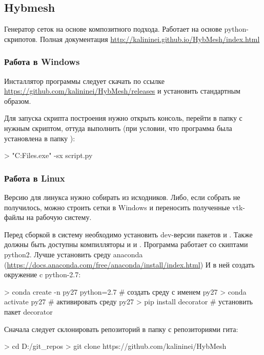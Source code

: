 \subsection{Hybmesh}
\label{sec:hybmesh}

Генератор сеток на основе композитного подхода.
Работает на основе python-скрипотов.
Полная документация \url{http://kalininei.github.io/HybMesh/index.html}

\subsubsection{Работа в Windows}
Инсталлятор программы следует скачать по ссылке
\url{https://github.com/kalininei/HybMesh/releases}
и установить стандартным образом.

Для запуска скрипта построения  нужно
открыть консоль, перейти в папку с нужным скриптом,
оттуда выполнить (при условии, что программа была установлена в папку ):
\begin{shelloutput}
> "C:\Program Files\HybMesh\bin\hybmesh.exe" -sx script.py
\end{shelloutput}

\subsubsection{Работа в Linux}
Версию для линукса нужно собирать из исходников.
Либо, если собрать не получилось,
можно строить сетки в Windows и переносить
полученные vtk-файлы на рабочую систему. 

Перед сборкой в систему необходимо установить dev-версии
пакетов  и . Также 
должны быть доступны компилляторы  и  и .
Программа работает со скиптами python2.
Лучше установить среду anaconda (\url{https://docs.anaconda.com/free/anaconda/install/index.html})
И в ней создать окружение c python-2.7:
\begin{shelloutput}
> conda create -n py27 python=2.7   # создать среду с именем py27
> conda activate py27               # активировать среду py27
> pip install decorator             # установить пакет decorator
\end{shelloutput}

Сначала следует склонировать репозиторий в папку с репозиториями гита:
\begin{shelloutput}
> cd D:/git_repos
> git clone https://github.com/kalininei/HybMesh
\end{shelloutput}

